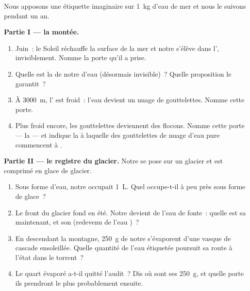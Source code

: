 \begin{problem}\label{pb:g6:water-states:1}
Nous apposons une étiquette imaginaire sur \qty{1}{kg} d'eau de mer
et nous le suivons pendant un an.

\medskip\noindent\textbf{Partie I --- la montée.}
\begin{enumerate}
  \item Juin~: le Soleil réchauffe la surface de la mer et notre
         s'élève dans l', invisiblement. Nomme la porte
        qu'il a prise.
  \item Quelle est la  de notre  d'eau (désormais
        invisible)~? Quelle proposition le garantit~?
  \item À \qty{3000}{m}, l' est froid~: l'eau devient un nuage de
        gouttelettes. Nomme cette porte.
  \item Plus froid encore, les gouttelettes deviennent des flocons.
        Nomme cette porte --- la  --- et indique la
         à laquelle des gouttelettes de nuage d'eau pure
        commencent à .
\end{enumerate}

\medskip\noindent\textbf{Partie II --- le registre du glacier.}
Notre  se pose sur un glacier et est comprimé en glace de
glacier.
\begin{enumerate}[resume]
  \item Sous forme d'eau, notre  occupait \qty{1}{L}. Quel
         occupe-t-il à peu près sous forme de glace~?
  \item Le front du glacier fond en été. Notre  devient
        de l'eau de fonte~: quelle est sa  maintenant, et son
         (redevenu de l'eau )~?
  \item En descendant la montagne, \qty{250}{g} de notre 
        s'évaporent d'une vasque de cascade ensoleillée. Quelle
        quantité de l'eau étiquetée poursuit sa route à l'état
         dans le torrent~?
  \item Le quart évaporé a-t-il quitté l'audit~? Dis où sont ses
        \qty{250}{g}, et quelle porte ils prendront le plus
        probablement ensuite.
\end{enumerate}


\end{problem}
